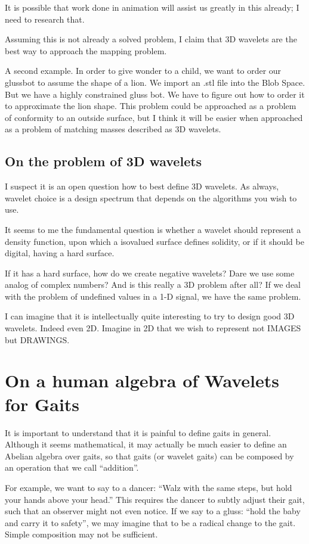\documentclass[11pt]{article}
\begin{document}
It is possible that work done in animation will assist us greatly in this already; I need
to research that.

Assuming this is not already a solved problem, I claim that 3D wavelets are the best way
to approach the mapping problem.

A second example.  In order to give wonder to a child, we want to order our glussbot to
assume the shape of a lion. We import an .stl file into the Blob Space.  But we have a highly
constrained gluss bot.  We have to figure out how to order it to approximate the lion shape.
This problem could be approached as a problem of conformity to an outside surface, but I think
it will be easier when approached as a problem of matching masses described as 3D wavelets.

\subsection{On the problem of 3D wavelets}

I suspect it is an open question how to best define 3D wavelets.
As always, wavelet choice is a design spectrum that depends on the algorithms you wish to use.

It seems to me the fundamental question is whether a wavelet should represent a density function,
upon which a isovalued surface defines solidity, or if it should be digital, having a hard surface.

If it has a hard surface, how do we create negative wavelets?  Dare we use some analog of complex
numbers?  And is this really a 3D problem after all?  If we deal with the problem of undefined
values in a 1-D signal, we have the same problem.

I can imagine that it is intellectually quite interesting to try to design good 3D wavelets.
Indeed even 2D.  Imagine in 2D that we wish to represent not IMAGES but DRAWINGS.

\section{On a human algebra of Wavelets for Gaits}

It is important to understand that it is painful to define gaits in general. Although
it seems mathematical, it may actually be much easier to define an Abelian algebra over gaits,
so that gaits (or wavelet gaits) can be composed by an operation that we call ``addition''.

For example, we want to say to a dancer: ``Walz with the same steps, but hold your hands
above your head.'' This requires the dancer to subtly adjust their gait, such that an observer
might not even notice.  If we say to a gluss: ``hold the baby and carry it to safety'', we
may imagine that to be a radical change to the gait.  Simple composition may not be sufficient.
\end{document}
